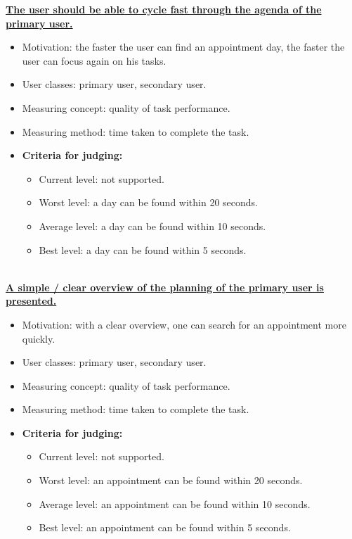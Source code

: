\documentclass[11pt, a4paper,svglistings]{report}
\begin{document}
\textbf{\underline{The user should be able to cycle fast through the agenda of the primary user.}}
\begin{itemize}
\item{Motivation: the faster the user can find an appointment day, the faster the user can focus again on his tasks.}
\item{User classes: primary user, secondary user.}
\item{Measuring concept: quality of task performance.}
\item{Measuring method: time taken to complete the task.}
\item{\textbf{Criteria for judging:}}
\begin{itemize}
\item{Current level: not supported.}
\item{Worst level: a day can be found within 20 seconds.}
\item{Average level: a day can be found within 10 seconds.}
\item{Best level: a day can be found within 5 seconds. \\ \\}
\end{itemize}
\end{itemize}
\textbf{\underline{A simple / clear overview of the planning of the primary user is presented.}}
\begin{itemize}
\item{Motivation: with a clear overview, one can search for an appointment more quickly.}
\item{User classes: primary user, secondary user.}
\item{Measuring concept: quality of task performance.}
\item{Measuring method: time taken to complete the task.}
\item{\textbf{Criteria for judging:}}
\begin{itemize}
\item{Current level: not supported.}
\item{Worst level: an appointment can be found within 20 seconds.}
\item{Average level: an appointment can be found within 10 seconds.}
\item{Best level: an appointment can be found within 5 seconds. \\ \\}
\end{itemize}
\end{itemize}
\end{document}
